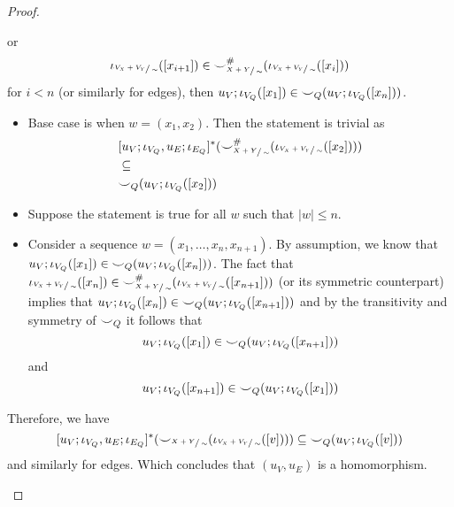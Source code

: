 \begin{proof}
\begin{enumerate}
\begin{itemize}
        or 
        \[
            \iota_{\sfrac{V_{X} + V_{Y}}{\sim}}([x_{i+1}]) \in {\smile}_{\sfrac{X+Y}{\sim}}^{{\#}}(\iota_{\sfrac{V_{X} + V_{Y}}{\sim}}([x_{i}]))
        \]
        for $i < n$ (or similarly for edges), then $u_{V};\iota_{V_{Q}}([x_1]) \in {\smile}_{Q}(u_{V};\iota_{V_{Q}}([x_n]))$.
        \begin{itemize}
            \item Base case is when $w = (x_1,x_2)$.
                  Then the statement is trivial as 
                  \begin{align*}
                  &[u_{V};\iota_{V_{Q}},u_{E};\iota_{E_{Q}}]^{*}({\smile}_{\sfrac{X+Y}{\sim}}^{{\#}}(\iota_{\sfrac{V_{X} + V_{Y}}{\sim}}([x_2])))\\
                  &\subseteq\\
                  &{\smile}_{Q}(u_{V};\iota_{V_{Q}}([x_2]))
                  \end{align*}
            \item Suppose the statement is true for all $w$ such that $|w| \leq n$.
            \item Consider a sequence $w = (x_1, \ldots, x_{n}, x_{n+1})$.
                  By assumption, we know that $u_{V};\iota_{V_{Q}}([x_1]) \in {\smile}_{Q}(u_{V};\iota_{V_{Q}}([x_n]))$.
                  The fact that $\iota_{\sfrac{V_{X} + V_{Y}}{\sim}}([x_{n}]) \in {\smile}_{\sfrac{X+Y}{\sim}}^{{\#}}(\iota_{\sfrac{V_{X} + V_{Y}}{\sim}}([x_{n+1}]))$ (or its symmetric counterpart) implies that $u_{V};\iota_{V_{Q}}([x_{n}]) \in {\smile}_{Q}(u_{V};\iota_{V_{Q}}([x_{n+1}]))$ and by the transitivity and symmetry of ${\smile}_{Q}$ it follows that
                \[
                    u_{V};\iota_{V_{Q}}([x_1]) \in {\smile}_{Q}(u_{V};\iota_{V_{Q}}([x_{n+1}]))
                \]
                and
                \[
                    u_{V};\iota_{V_{Q}}([x_{n+1}]) \in {\smile}_{Q}(u_{V};\iota_{V_{Q}}([x_{1}]))
                \]
        \end{itemize}
       \end{itemize}
       Therefore, we have
       \[
        [u_{V};\iota_{V_{Q}}, u_{E};\iota_{E_{Q}}]^{*}({\smile}_{\sfrac{X+Y}{\sim}}(\iota_{\sfrac{V_{X} + V_{Y}}{\sim}}([v]))) \subseteq {\smile}_{Q}(u_{V};\iota_{V_{Q}}([v]))
       \]
       and similarly for edges. Which concludes that $(u_{V},u_{E})$ is a homomorphism.
    \end{enumerate}
\end{proof}


